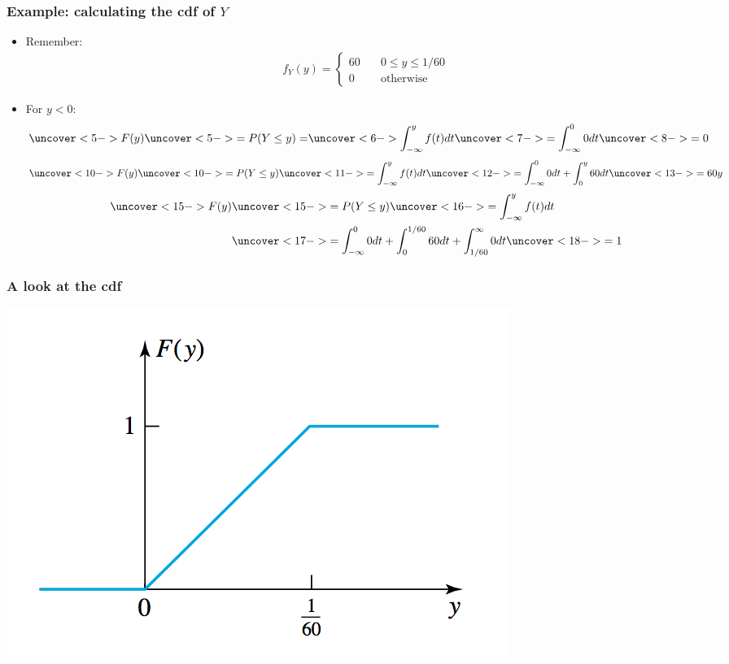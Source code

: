 \documentclass[handout]{beamer}\usepackage[]{graphicx}\usepackage[]{color}
\numberwithin{equation}{section}
\begin{document}
\begin{frame}
\frametitle{Example: calculating the cdf of $Y$} \scriptsize
\begin{itemize}
\pause \item Remember:
\pause \begin{align*}
f_Y(y) = \begin{cases}
60 & \quad 0 \le y \le 1/60 \\
0 & \quad \text{otherwise}
\end{cases}
\end{align*}
\pause \item For $y < 0$:
\begin{align*}
\uncover<5->{F(y) } \uncover<5->{=P(Y \le y) =}\uncover<6->{ \int_{-\infty}^y f(t) dt}\uncover<7->{ = \int_{-\infty}^0 0 dt} \uncover<8->{= 0}
\end{align*}
\begin{align*}
\uncover<10->{F(y)} \uncover<10->{= P(Y \le y)} \uncover<11->{= \int_{-\infty}^y f(t) dt} \uncover<12->{= \int_{-\infty}^0 0 dt + \int_0^y 60 dt} \uncover<13->{= 60y }
\end{align*}
\begin{align*}
\uncover<15->{F(y)} &\uncover<15->{= P(Y \le y)} \uncover<16->{= \int_{-\infty}^y f(t) dt }\\
& \uncover<17->{= \int_{-\infty}^0 0 dt + \int_0^{1/60} 60 dt + \int_{1/60}^{\infty} 0 dt} \uncover<18->{ = 1}
\end{align*}
\end{itemize}
\end{frame}

\begin{frame}
\frametitle{A look at the cdf}
 \includegraphics{../../fig/delaycdfpic.png}
\end{frame}
\end{document}
